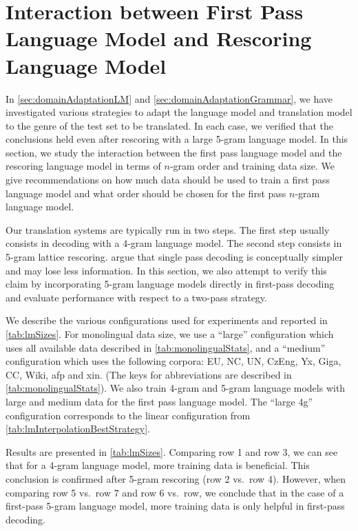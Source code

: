 
\section{Interaction between First Pass Language Model and Rescoring Language Model}
\label{sec:bestPossibleRescoring}

In \autoref{sec:domainAdaptationLM} and \autoref{sec:domainAdaptationGrammar},
we have investigated various strategies to adapt the language model
and translation model to the genre of the test set to be translated.
In each case, we verified that the conclusions held even after
rescoring with a large 5-gram language model.
In this section, we study the interaction between the first pass language model
and the rescoring language model in terms of $n$-gram order and training
data size. We give recommendations on how much
data should be used to train a first pass language model
and what order should be chosen for the first pass
$n$-gram language model.

Our translation systems are typically run in two steps. The
first step usually consists in decoding with
a 4-gram language model. The second step consists
in 5-gram lattice rescoring.
\citet{brants-popat-xu-och-dean:2007:EMNLP-CoNLL} argue
that single pass decoding is conceptually simpler
and may lose less information.
In this section, we also attempt to verify this claim
by incorporating 5-gram language models directly in
first-pass decoding and evaluate performance with respect
to a two-pass strategy.

We describe the various configurations used for experiments and
reported in \autoref{tab:lmSizes}. For monolingual data size,
we use a ``large'' configuration which uses all available
data described in \autoref{tab:monolingualStats}, and a
``medium'' configuration which uses the following corpora: EU, NC, UN, CzEng, Yx, Giga, CC, Wiki, afp and xin.
(The keys for abbreviations are described in \autoref{tab:monolingualStats}).
We also train 4-gram and 5-gram language models with large and
medium data for the first pass language model.
The ``large 4g'' configuration corresponds to the linear
configuration from \autoref{tab:lmInterpolationBestStrategy}.

Results are presented in \autoref{tab:lmSizes}.
Comparing row 1 and row 3, we can see that for a 4-gram
language model, more training data is beneficial.
This conclusion is confirmed after 5-gram rescoring (row 2 vs.\ row 4).
However, when comparing row 5 vs.\ row 7 and row 6 vs.\ row, we conclude that
in the case of a first-pass 5-gram language model, more training
data is only helpful in first-pass decoding.


